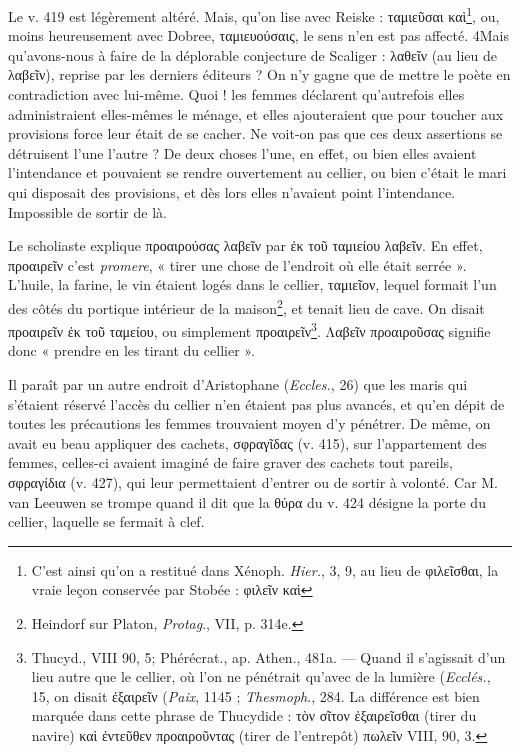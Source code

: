 \documentclass{book}%
\newcommand{\italique}[1]{\textit{#1}}%
\newcommand{\note}[1]{\footnote{#1}}
\begin{document}
Le v. 419 est légèrement altéré. Mais, qu'on lise avec Reiske : ταμιεῦσαι καὶ\note{C'est ainsi qu'on a restitué dans Xénoph. \italique{Hier.}, 3, 9, au lieu de φιλεῖσθαι, la vraie leçon conservée par Stobée : φιλεῖν καὶ}, ou, moins heureusement avec Dobree, ταμιευούσαις, le sens n'en est pas affecté. 4Mais qu'avons-nous à faire de la déplorable conjecture de Scaliger : λαθεῖν (au lieu de λαβεῖν), reprise par les derniers éditeurs ? 
On n'y gagne que de mettre le poète en contradiction avec lui-même. Quoi ! les femmes déclarent qu'autrefois elles administraient elles-mêmes le ménage, et elles ajouteraient que pour toucher aux provisions force leur était de se cacher. Ne voit-on pas que ces deux assertions se détruisent l'une l'autre ? De deux choses l'une, en effet, ou bien elles avaient l'intendance et pouvaient se rendre ouvertement au cellier, ou bien c'était le mari qui disposait des provisions, et dès lors elles n'avaient point l'intendance. 
Impossible de sortir de là. 

Le scholiaste explique προαιρούσας λαβεῖν par ἐκ τοῦ ταμιείου λαβεῖν. En effet, προαιρεῖν c'est \italique{promere}, « tirer une chose de l'endroit où elle était serrée ». 
L'huile, la farine, le vin étaient logés dans le cellier, ταμιεῖον, lequel formait l'un des côtés du portique intérieur de la maison\note{Heindorf sur Platon, \italique{Protag}., VII, p. 314e.}, et tenait lieu de cave. On disait προαιρεῖν ἐκ τοῦ ταμείου, ou simplement προαιρεῖν\note{Thucyd., VIII 90, 5; Phérécrat., ap. Athen., 481a. — Quand il s'agissait d'un lieu autre que le cellier, où l'on ne pénétrait qu'avec de la lumière (\italique{Ecclés.}, 15, on disait ἐξαιρεῖν (\italique{Paix}, 1145 ; \italique{Thesmoph}., 284. La différence est bien marquée dans cette phrase de Thucydide : τὸν σῖτον ἐξαιρεῖσθαι (tirer du navire) καὶ ἐντεῦθεν προαιροῦντας (tirer de l'entrepôt) πωλεῖν VIII, 90, 3.}. Λαβεῖν προαιροῦσας signifie donc « prendre en les tirant du cellier ».

Il paraît par un autre endroit d'Aristophane (\italique{Eccles.}, 26) que les maris qui s'étaient réservé l'accès du cellier n'en étaient pas plus avancés, et qu'en dépit de toutes les précautions les femmes trouvaient moyen d'y pénétrer. De même, on avait eu beau appliquer des cachets, σφραγῖδας (v. 415), sur l'appartement des femmes, celles-ci avaient imaginé de faire graver des cachets tout pareils, σφραγίδια (v. 427), qui leur permettaient d'entrer ou de sortir à volonté. Car M. van Leeuwen se trompe quand il dit que la θύρα du v. 424 désigne la porte du cellier, laquelle se fermait à clef.
\end{document}
